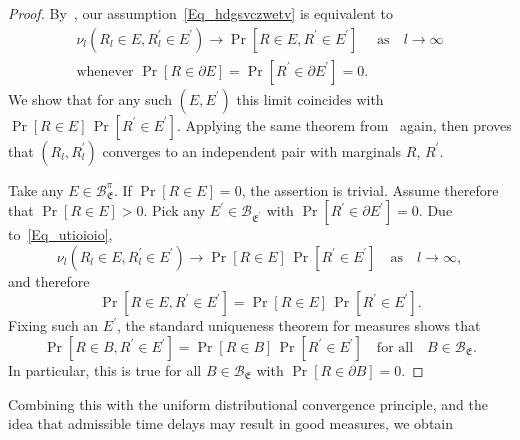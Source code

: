 \documentclass[AHL,Unicode,longabstracts]{cedram}
\newcommand{\clB}{\mathcal{B}}
\newcommand{\frkE}{\mathfrak{E}}
\begin{document}
\begin{proof}
By~\cite[Theorem~2.8]{Bi}, our assumption~\eqref{Eq_hdgsvczwetv} is equivalent to
\begin{equation}\label{Eq_hjgkhjkhjkfkhjkgfkhjkgfjh}
\begin{gathered}
\nu_{l}\left(R_{l}\in E,R_{l}^{\prime}\in E^{\prime}\right)\longrightarrow\Pr[R\in E,R^{\prime}\in E^{\prime}]\quad\text{ as}\quad l\rightarrow\infty
\\
\text{whenever }\Pr\left[R\in\partial E\right]=\Pr\left[R^{\prime}\in\partial E^{\prime}\right]=0 . 
\end{gathered}
\end{equation}
We show that for any such $(E,E^{\prime})$ this limit coincides with $\Pr[R\in E]\,\Pr[R^{\prime}\in E^{\prime}]$. Applying the same theorem from~\cite{Bi} again, then proves that $(R_{l},R_{l}^{\prime})$ converges to an independent pair with marginals $R$, $R^{\prime}$.

Take any $E\in\clB_{\frkE}^{\pi}$. If $\Pr[R\in E]=0$, the assertion is trivial. Assume therefore that $\Pr[R\in E]>0$. Pick any $E^{\prime}\in\clB_{\frkE^{\prime}}$ with $\Pr[R^{\prime}
\in\partial E^{\prime}]=0$. Due to~\eqref{Eq_utioioio},
\[
\nu_{l}\left(R_{l}\in E,R_{l}^{\prime}\in E^{\prime}\right)\longrightarrow\Pr[R\in E]\,\Pr\left[R^{\prime}\in E^{\prime}\right]\quad\text{as}\quad l\rightarrow\infty,
\]
and therefore
\[
\Pr\left[R\in E,R^{\prime}\in E^{\prime}\right]=\Pr[R\in E]\,\Pr\left[R^{\prime}\in E^{\prime}\right].
\]
Fixing such an $E^{\prime}$, the standard uniqueness theorem for measures shows that
\[
\Pr\left[R\in B,R^{\prime}\in E^{\prime}\right]=\Pr[R\in B]\,\Pr\left[R^{\prime}\in E^{\prime }\right]\quad\text{for all}\quad B\in\clB_{\frkE}.
\]
In particular, this is true for all $B\in\clB_{\frkE}$ with $\Pr[R\in\partial B]=0$.
\end{proof}


Combining this with the uniform distributional convergence principle, and the idea that admissible time delays may result in good measures, we obtain
\end{document}
